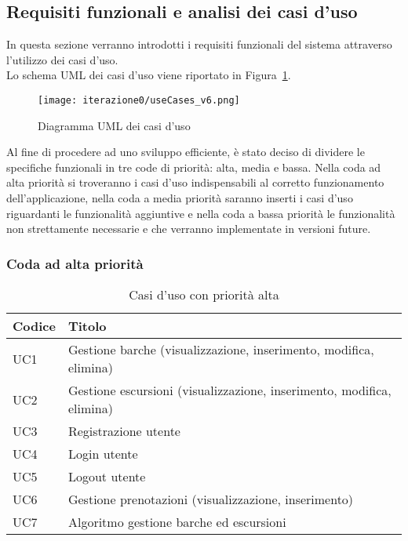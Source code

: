 \subsection{Requisiti funzionali e analisi dei casi d'uso}

In questa sezione verranno introdotti i requisiti funzionali del sistema attraverso l'utilizzo dei casi d'uso.
\\Lo schema UML dei casi d'uso viene riportato in Figura~\ref{fig:casiduso}.

\begin{figure}[htbp]
    \texttt{[image: iterazione0/useCases\_v6.png]}
    \centering
    \caption{Diagramma UML dei casi d'uso}\label{fig:casiduso}
\end{figure}

Al fine di procedere ad uno sviluppo efficiente, è stato deciso di dividere le specifiche funzionali in tre code di priorità: alta, media e bassa. Nella coda ad alta priorità si troveranno i casi d'uso indispensabili al corretto funzionamento dell'applicazione, nella coda a media priorità saranno inserti i casi d'uso riguardanti le funzionalità aggiuntive e nella coda a bassa priorità le funzionalità non strettamente necessarie e che verranno implementate in versioni future.

\clearpage
\subsubsection{Coda ad alta priorità}

\begin{table}[htbp]
 \centering
 \begin{tabularx}{\textwidth}{|>{\centering\arraybackslash} m{4em}| >{\raggedright\arraybackslash}X |} 
 \hline
 \textbf{Codice} & \textbf{Titolo} \\ [0.5ex]
 \hline\hline
UC1 & Gestione barche (visualizzazione, inserimento, modifica, elimina) \\
\hline
UC2 & Gestione escursioni (visualizzazione, inserimento, modifica, elimina) \\
\hline
UC3 & Registrazione utente \\
\hline
UC4 & Login utente \\
\hline
UC5 & Logout utente \\
\hline
UC6 & Gestione prenotazioni (visualizzazione, inserimento) \\
\hline
UC7 & Algoritmo gestione barche ed escursioni \\
\hline
\end{tabularx}
\caption{Casi d'uso con priorità alta}
\label{Casi d'uso con priorità alta}
\end{table}

